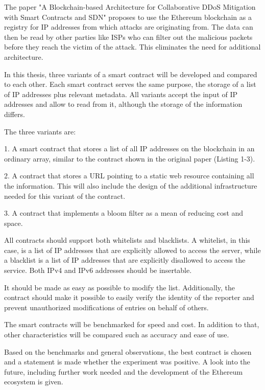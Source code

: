 The paper {"}A Blockchain-based Architecture for Collaborative DDoS Mitigation with Smart Contracts and SDN{"} \cite{OriginalPaper} proposes to use the Ethereum blockchain as a registry for IP addresses from which attacks are originating from. The data can then be read by other parties like ISPs who can filter out the malicious packets before they reach the victim of the attack. This eliminates the need for additional architecture.

In this thesis, three variants of a smart contract will be developed and compared to each other. Each smart contract serves the same purpose, the storage of a list of IP addresses plus relevant metadata. All variants accept the input of IP addresses and allow to read from it, although the storage of the information differs.

The three variants are:

1. A smart contract that stores a list of all IP addresses on the blockchain in an ordinary array, similar to the contract shown in the original paper \cite{OriginalPaper} (Listing 1-3).

2. A contract that stores a URL pointing to a static web resource containing all the information. This will also include the design of the additional infrastructure needed for this variant of the contract.

3. A contract that implements a bloom filter as a mean of reducing cost and space.

All contracts should support both whitelists and blacklists.
A whitelist, in this case, is a list of IP addresses that are explicitly allowed to access the server, while a blacklist is a list of IP addresses that are explicitly disallowed to access the service.
Both IPv4 and IPv6 addresses should be insertable.

It should be made as easy as possible to modify the list. Additionally, the contract should make it possible to easily verify the identity of the reporter and prevent unauthorized modifications of entries on behalf of others.

The smart contracts will be benchmarked for speed and cost. In addition to that, other characteristics will be compared such as accuracy and ease of use. 

Based on the benchmarks and general observations, the best contract is chosen and a statement is made whether the experiment was positive. A look into the future, including further work needed and the development of the Ethereum ecosystem is given.

